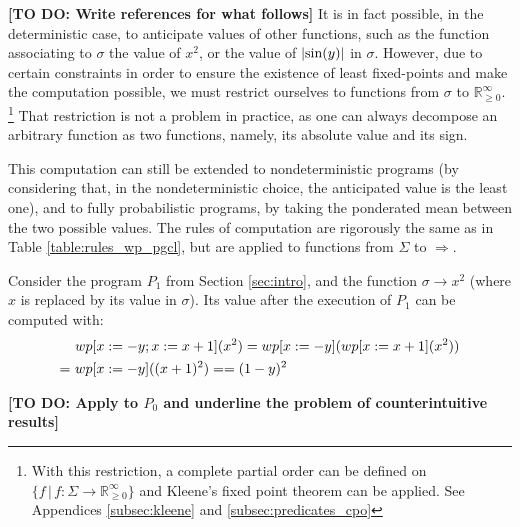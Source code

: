 \documentclass[a4paper,10pt]{llncs}
\def\RRposi {{\mathbb R_{\geq 0}^{\infty}}}
\newcommand\todo[1]{{\color{red}\textbf{[TO DO:  #1]}}}
\begin{document}
	\todo{Write references for what follows}
It is in fact possible, in the deterministic case, to anticipate values of other functions, such as the function associating to $\sigma$ the value of $x^2$, or the value of $|\textnormal{sin}(y)|$ in $\sigma$. However, due to certain constraints in order to ensure the existence of least fixed-points and make the computation possible, we must restrict ourselves to functions from $\sigma$ to $\RRposi$. \footnote{With this restriction, a complete partial order can be defined on $\{f \,|\, f : \Sigma \rightarrow \RRposi \}$ and Kleene's fixed point theorem can be applied. See Appendices \ref{subsec:kleene} and \ref{subsec:predicates_cpo}} That restriction is not a problem in practice, as one can always decompose an arbitrary function as two functions, namely, its absolute value and its sign. \bigskip

This computation can still be extended to nondeterministic programs (by considering that, in the nondeterministic choice, the anticipated value is the least one), and to fully probabilistic programs, by taking the ponderated mean between the two possible values. The rules of computation are rigorously the same as in Table \ref{table:rules_wp_pgcl}, but are applied to functions from $\Sigma$ to $\Rightarrow$.

\begin{example} Consider the program $P_1$ from Section \ref{sec:intro}, and the function $\sigma \rightarrow x^2$ (where $x$ is replaced by its value in $\sigma$). Its value after the execution of $P_1$ can be computed with:
\begin{align*}
& \textnormal{ }wp[x := - y ; x := x+1](x^2) = wp[x := - y ](wp[x := x+1](x^2)) \\
 =& \textnormal{ }wp[x := - y ]((x+1)^2) = = (1-y)^2  \\
\end{align*}
\end{example}
	\todo{Apply to $P_0$ and underline the problem of counterintuitive results}
\end{document}
